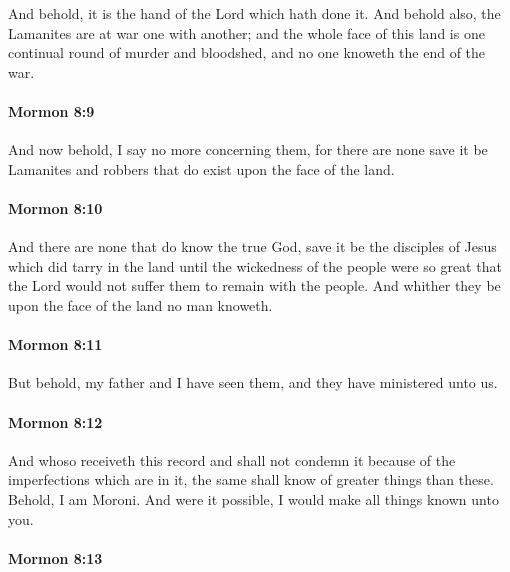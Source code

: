 			And behold, it is the hand of the Lord which hath done it.
			And behold also, the Lamanites are at war one with another;
			and the whole face of this land is one continual round of murder and bloodshed,
			and no one knoweth the end of the war.

		\paragraph{Mormon 8:9} %
			\label{MORMON-8-9}

			And now behold, I say no more concerning them,
			for there are none save it be Lamanites and robbers
			that do exist upon the face of the land.

		\paragraph{Mormon 8:10} %
			\label{MORMON-8-10}

			And there are none that do know the true God,
			save it be the disciples of Jesus which did tarry in the land
			until the wickedness of the people were so great
			that the Lord would not suffer them to remain with the people.
			And whither they be upon the face of the land no man knoweth.

		\paragraph{Mormon 8:11} %
			\label{MORMON-8-11}

			But behold, my father and I have seen them,
			and they have ministered unto us.

		\paragraph{Mormon 8:12} %
			\label{MORMON-8-12}

			And whoso receiveth this record and shall not condemn it
			because of the imperfections which are in it,
			the same shall know of greater things than these.
			Behold, I am Moroni.
			And were it possible,
			I would make all things known unto you.

		\paragraph{Mormon 8:13} %
			\label{MORMON-8-13}


